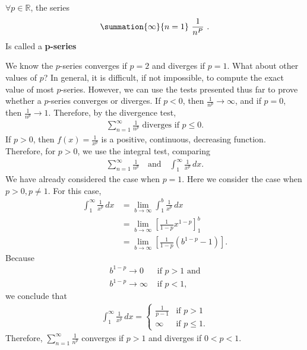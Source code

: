 \documentclass{report}
\begin{document}
    \bigbreak \noindent 
    \begin{definition}
       $\forall p \in \mathbb{R}$, the series 
       \begin{align*}
           \summation{\infty}{n=1}\ \frac{1}{n^{P}}\ 
       .\end{align*}
       Is called a \textbf{p-series}
    \end{definition}

    \bigbreak \noindent 
    We know the \( p \)-series converges if \( p=2 \) and diverges if \( p=1 \).
What about other values of \( p \)?
In general, it is difficult, if not impossible, to compute the exact value of most \( p \)-series. However, we can use the tests presented thus far to prove whether a \( p \)-series converges or diverges.
\bigbreak \noindent 
If \( p<0 \), then \( \frac{1}{n^p} \to \infty \), and if \( p=0 \), then \( \frac{1}{n^p} \to 1 \).
Therefore, by the divergence test,
\begin{align}
\sum_{n=1}^{\infty} \frac{1}{n^p} \text{ diverges if } p \leq 0.
\end{align}
If \( p>0 \), then \( f(x) = \frac{1}{x^p} \) is a positive, continuous, decreasing function. Therefore, for \( p>0 \), we use the integral test, comparing
\begin{align}
\sum_{n=1}^{\infty} \frac{1}{n^p} \quad \text{and} \quad \int_{1}^{\infty} \frac{1}{x^p} \, dx.
\end{align}
We have already considered the case when \( p=1 \).
Here we consider the case when \( p>0, p \neq 1 \).
For this case,
\begin{align}
\int_{1}^{\infty} \frac{1}{x^p} \, dx &= \lim_{b \to \infty} \int_{1}^{b} \frac{1}{x^p} \, dx \\
&= \lim_{b \to \infty} \left[ \frac{1}{1-p} x^{1-p} \right]_{1}^{b} \\
&= \lim_{b \to \infty} \left[ \frac{1}{1-p} \left( b^{1-p} - 1 \right) \right].
\end{align}
Because
\begin{align}
b^{1-p} \to 0 &\text{ if } p>1 \text{ and} \\
b^{1-p} \to \infty &\text{ if } p<1,
\end{align}
we conclude that
\begin{align}
\int_{1}^{\infty} \frac{1}{x^p} \, dx =
\begin{cases}
\frac{1}{p-1} & \text{if } p>1 \\
\infty & \text{if } p \leq 1.
\end{cases}
\end{align}
Therefore, \( \sum_{n=1}^{\infty} \frac{1}{n^p} \)
converges if \( p>1 \)
and diverges if \( 0<p<1 \).
\bigbreak \noindent 
\end{document}
